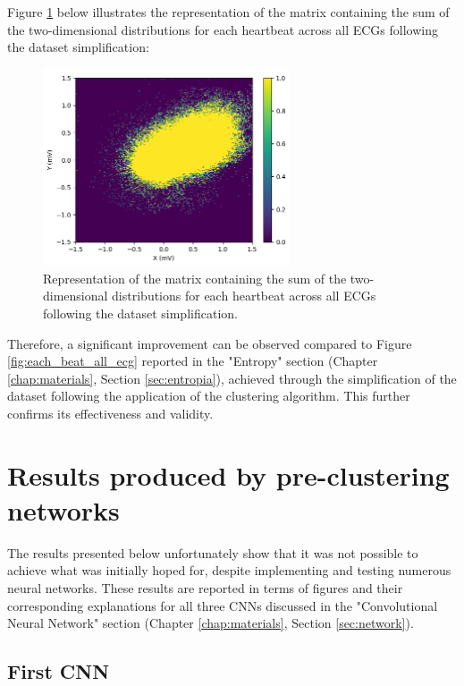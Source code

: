 \documentclass[12pt,italian]{report}
\begin{document}
Figure \ref{fig:sum_each_beat_all_ecg} below illustrates the representation of the matrix containing the sum of the two-dimensional distributions for each heartbeat across all ECGs following the dataset simplification:

\begin{figure}[H]
    \centering
    \includegraphics[width=0.65\textwidth]{images/sum_each_beat_all_ecg.png}
    \captionsetup{justification=centering}
    \caption{Representation of the matrix containing the sum of the two-dimensional distributions for each heartbeat across all ECGs following the dataset simplification.}
    \label{fig:sum_each_beat_all_ecg}
\end{figure}

Therefore, a significant improvement can be observed compared to Figure \ref{fig:each_beat_all_ecg} reported in the "Entropy" section (Chapter \ref{chap:materials}, Section \ref{sec:entropia}), achieved through the simplification of the dataset following the application of the clustering algorithm. This further confirms its effectiveness and validity.

\section{Results produced by pre-clustering networks}
\label{sec:network_risultati}

The results presented below unfortunately show that it was not possible to achieve what was initially hoped for, despite implementing and testing numerous neural networks. These results are reported in terms of figures and their corresponding explanations for all three CNNs discussed in the "Convolutional Neural Network" section (Chapter \ref{chap:materials}, Section \ref{sec:network}).

\subsection{First CNN}
\label{subsec:first_cnn_results}
\end{document}
